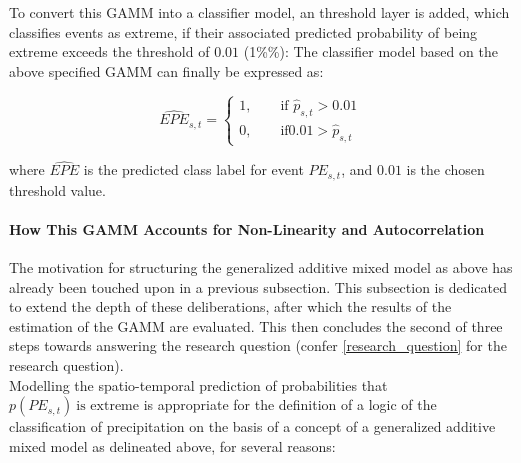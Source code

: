 \documentclass[
  12pt,
]{article}
\begin{document}
To convert this GAMM into a classifier model, an threshold layer is
added, which classifies events as extreme, if their associated predicted
probability of being extreme exceeds the threshold of \(0.01\) (1\%\%):
The classifier model based on the above specified GAMM can finally be
expressed as:

\begin{equation}\label{eq:classifier_layer_gamm}
\widehat{EPE}_{s,t} =
\begin{cases}
1, \qquad \text{if } \widehat{p}_{s,t} > 0.01 \\
0, \qquad \text{if} 0.01 > \widehat{p}_{s,t}
\end{cases}
\end{equation}

where \(\widehat{EPE}\) is the predicted class label for event
\(PE_{s,t}\), and \(0.01\) is the chosen threshold value.

\hypertarget{how-this-gamm-accounts-for-non-linearity-and-autocorrelation}{%
\paragraph{\texorpdfstring{How This GAMM Accounts for Non-Linearity and
Autocorrelation
\newline}{How This GAMM Accounts for Non-Linearity and Autocorrelation }}\label{how-this-gamm-accounts-for-non-linearity-and-autocorrelation}}

The motivation for structuring the generalized additive mixed model as
above has already been touched upon in a previous subsection. This
subsection is dedicated to extend the depth of these deliberations,
after which the results of the estimation of the GAMM are evaluated.
This then concludes the second of three steps towards answering the
research question (confer \ref{research_question} for the research
question).\\
Modelling the spatio-temporal prediction of probabilities that
\(p(PE_{s,t})\:\text{is extreme}\) is appropriate for the definition of
a logic of the classification of precipitation on the basis of a concept
of a generalized additive mixed model as delineated above, for several
reasons:
\end{document}
